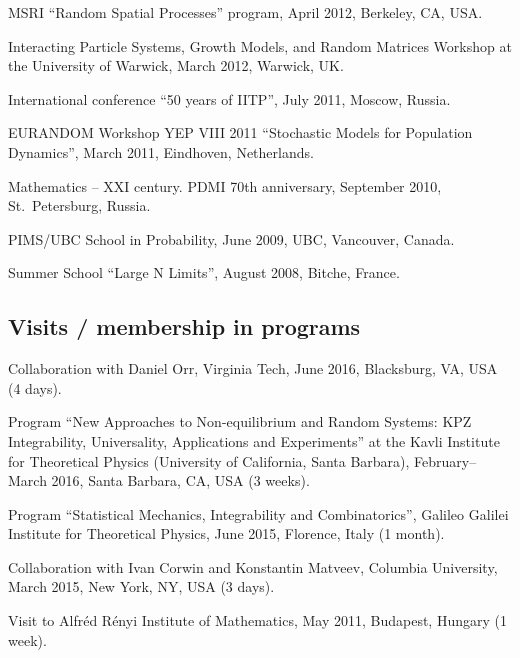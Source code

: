 \documentclass[letterpaper,11pt]{article}
\begin{document}
\begin{etaremune}
\item  
MSRI ``Random Spatial Processes'' program,
April 2012, Berkeley, CA, USA.


\item 
Interacting Particle Systems, Growth Models, and Random Matrices Workshop at the University of Warwick, March 2012, Warwick, UK.


\item International conference ``50 years of IITP'', July 2011, Moscow, Russia.
  
\item EURANDOM Workshop YEP VIII 2011 ``Stochastic Models for Population Dynamics'', March 2011, Eindhoven, Netherlands.

\item Mathematics -- XXI century. PDMI 70th anniversary, September 2010, St.~Petersburg, Russia.

\item PIMS/UBC School in Probability, June 2009, UBC, Vancouver, Canada. 

\item 
Summer School ``Large N Limits'', August 2008, Bitche, France. 
\end{etaremune}

\subsection*{Visits / membership in programs}

\begin{etaremune}
	\item Collaboration with Daniel Orr, 
	Virginia Tech, 
	June 2016,
	Blacksburg, VA, USA (4 days).
	\item
	Program ``New Approaches to Non-equilibrium and Random Systems: KPZ Integrability, Universality, Applications and Experiments''
	at the Kavli Institute for Theoretical Physics (University of California, Santa Barbara),
	February--March 2016, Santa Barbara, CA, USA (3 weeks).
	\item
	Program ``Statistical Mechanics, Integrability and Combinatorics'',
	Galileo Galilei Institute for Theoretical Physics, June 2015, Florence, Italy (1 month).
	\item Collaboration with Ivan Corwin and Konstantin Matveev,
	Columbia University, March 2015, New York, NY, USA (3 days).
	\item Visit to Alfr\'ed R\'enyi Institute of Mathematics,
	May 2011, Budapest, Hungary (1 week).
\end{etaremune}
\end{document}
